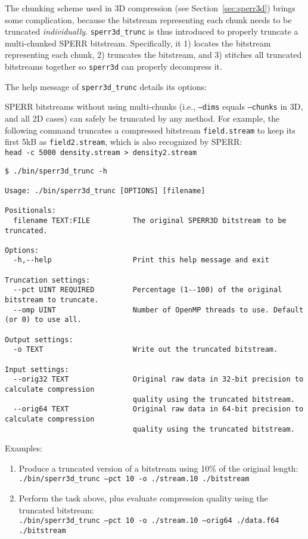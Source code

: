 \documentclass{article}
\newcommand{\callout}[1]{\begin{BlueBox}#1\end{BlueBox}}
\begin{document}
The chunking scheme used in 3D compression (see Section~\ref{sec:sperr3d}) 
brings some complication,
because the bitstream representing each chunk needs to be truncated \textit{individually}.
\texttt{sperr3d\_trunc} is thus introduced to properly truncate a multi-chunked SPERR bitstream.
Specifically, it 1) locates the bitstream representing each chunk,
2) truncates the bitstream, and 3) stitches all truncated bitstreams together so
\texttt{sperr3d} can properly decompress it.

The help message of \texttt{sperr3d\_trunc} details its options:

\callout{SPERR bitstreams without using multi-chunks (i.e., \texttt{--dims} equals 
\texttt{--chunks} in 3D, and all 2D cases) can safely be truncated by any method.
For example, the following command truncates a compressed bitstream \texttt{field.stream}
to keep its first 5kB as \texttt{field2.stream}, which is also recognized by SPERR:\\
\texttt{head -c 5000 density.stream > density2.stream}
}

\begin{verbatim}
$ ./bin/sperr3d_trunc -h

Usage: ./bin/sperr3d_trunc [OPTIONS] [filename]

Positionals:
  filename TEXT:FILE          The original SPERR3D bitstream to be truncated.

Options:
  -h,--help                   Print this help message and exit

Truncation settings:
  --pct UINT REQUIRED         Percentage (1--100) of the original bitstream to truncate.
  --omp UINT                  Number of OpenMP threads to use. Default (or 0) to use all.

Output settings:
  -o TEXT                     Write out the truncated bitstream.

Input settings:
  --orig32 TEXT               Original raw data in 32-bit precision to calculate compression
                              quality using the truncated bitstream.
  --orig64 TEXT               Original raw data in 64-bit precision to calculate compression
                              quality using the truncated bitstream.
\end{verbatim}

Examples:
\begin{enumerate}
\item Produce a truncated version of a bitstream using 10\% of the original length: \\
      \texttt{./bin/sperr3d\_trunc --pct 10 -o ./stream.10 ./bitstream}
\item Perform the task above, plus evaluate compression quality using the truncated
      bitstream:\\
      \texttt{./bin/sperr3d\_trunc --pct 10 -o ./stream.10 --orig64 ./data.f64 ./bitstream}
\end{enumerate}
\end{document}
